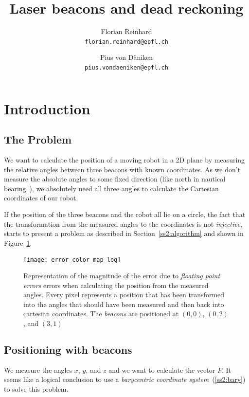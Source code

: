 \documentclass[a4paper, 12pt]{paper}
\author{Florian Reinhard\\
        \texttt{florian.reinhard@epfl.ch} \and
        Pius von Däniken\\
        \texttt{pius.vondaeniken@epfl.ch}}
\title{Laser beacons and dead reckoning}
\begin{document}
\maketitle

\tableofcontents

\section{Introduction}

\subsection{The Problem}

We want to calculate the position of a moving robot in a 2D plane by measuring
the relative angles between three beacons with known coordinates.
As we don't measure the absolute angles to some fixed direction (like north in
nautical bearing~\cite{wikipedia_bearing}), we absolutely need all three
angles to calculate the Cartesian coordinates of our robot.

If the position of the three beacons and the robot all lie on a circle, the
fact that the transformation from the measured angles to the coordinates is not
\emph{injective}, starts to present a problem as described in
Section~\ref{ss2:algorithm} and shown in Figure~\ref{fig:error_map}.

\begin{figure}[H]
    \centering
    \texttt{[image: error\_color\_map\_log]}
    \caption{Representation of the magnitude of the error due to
        \emph{floating point errors} errors when calculating the position from
        the measured angles. Every pixel represents a position that has been
        transformed into the angles that should have been measured and then back
        into cartesian coordinates. The \emph{beacons} are positioned at
        $\left(0, 0\right)$, $\left(0, 2\right)$, and $\left(3, 1\right)$}
\label{fig:error_map}
\end{figure}

\subsection{Positioning with beacons}

We measure the angles $x$, $y$, and $z$ and we want to calculate the vector $P$.
It seems like a logical conclusion to use a
\emph{barycentric coordinate system}~(\ref{ss2:bary}) to solve this problem.
\end{document}
